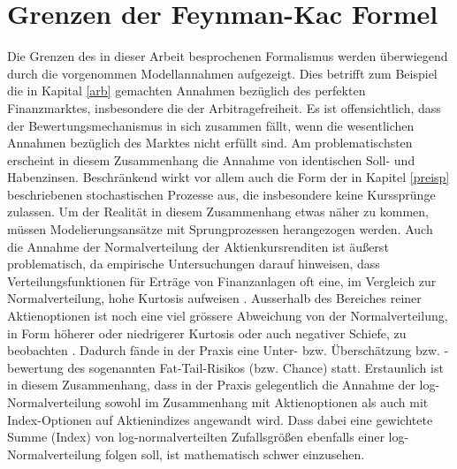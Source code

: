 \documentclass[12pt,a4paper,headsepline,bibliography=totoc,listof=totoc,headinclude=false,footinclude=false,BCOR5mm]{scrreprt} %
\begin{document}
\section{Grenzen der Feynman-Kac Formel} 
Die Grenzen des in dieser Arbeit besprochenen Formalismus werden \"uberwiegend durch die vorgenommen Modellannahmen aufgezeigt. Dies betrifft zum Beispiel die in Kapital \ref{arb} gemachten Annahmen bez\"uglich des perfekten Finanzmarktes, insbesondere die der Arbitragefreiheit. Es ist offensichtlich, dass der Bewertungsmechanismus in sich zusammen f\"allt, wenn die wesentlichen Annahmen bez\"uglich des Marktes nicht erf\"ullt sind. Am problematischsten erscheint in diesem Zusammenhang die Annahme von identischen Soll- und Habenzinsen.
Beschr\"ankend wirkt vor allem auch die Form der in Kapitel \ref{preisp} beschriebenen stochastischen Prozesse aus, die insbesondere keine Kursspr\"unge zulassen. Um der Realit\"at in diesem Zusammenhang etwas n\"aher zu kommen, m\"ussen Modelierungsans\"atze mit Sprungprozessen herangezogen werden. Auch die Annahme der Normalverteilung der Aktienkursrenditen ist \"au{\ss}erst problematisch, da empirische Untersuchungen darauf hinweisen, dass Verteilungsfunktionen f\"ur Ertr\"age von Finanzanlagen oft eine, im Vergleich zur Normalverteilung, hohe Kurtosis aufweisen \cite{Erben2006}. Ausserhalb des Bereiches reiner Aktienoptionen ist noch eine viel gr\"ossere Abweichung von der Normalverteilung, in Form h\"oherer oder niedrigerer Kurtosis oder auch negativer Schiefe, zu beobachten \cite[S. 377ff]{Busak2006}.
Dadurch f\"ande in der Praxis eine Unter- bzw. \"Ubersch\"atzung bzw. -bewertung des sogenannten Fat-Tail-Risikos (bzw. Chance) statt.
Erstaunlich ist in diesem Zusammenhang, dass in der Praxis gelegentlich die Annahme der log-Normalverteilung sowohl im Zusammenhang mit Aktienoptionen als auch mit Index-Optionen auf Aktienindizes angewandt wird. Dass dabei eine gewichtete Summe (Index) von log-normalverteilten Zufallsgr\"o{\ss}en ebenfalls einer log-Normalverteilung folgen soll, ist mathematisch schwer einzusehen.  
\end{document}
